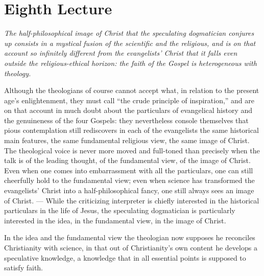 \documentclass[12pt,a4paper]{book}
\begin{document}
\chapter*{Eighth Lecture}
\label{ch:forel8}

\begin{center}\itshape
The half-philosophical image of Christ that the speculating dogmatician
conjures up consists in a mystical fusion of the scientific and the
religious, and is on that account so infinitely different from the
evangelists' Christ that it falls even outside the religious-ethical
horizon: the faith of the Gospel is heterogeneous with theology.
\end{center}

Although the theologians of course cannot accept what, in relation to the present age's
enlightenment, they must call ``the crude principle of inspiration,'' and are on that
account in much doubt about the particulars of evangelical history and the genuineness of
the four Gospels: they nevertheless console themselves that pious contemplation still
rediscovers in each of the evangelists the same historical main features, the same
fundamental religious view, the same image of Christ. The theological voice is never more
moved and full-toned than precisely when the talk is of the leading thought, of the
fundamental view, of the image of Christ. Even when one comes into embarrassment with all
the particulars, one can still cheerfully hold to the fundamental view; even when science
has transformed the evangelists' Christ into a half-philosophical fancy, one still always
sees an image of Christ. --- While the criticizing interpreter is chiefly interested in the
historical particulars in the life of Jesus, the speculating dogmatician is particularly
interested in the idea, in the fundamental view, in the image of Christ.

In the idea and the fundamental view the theologian now supposes he reconciles Christianity
with science, in that out of Christianity's own content he develops a speculative
knowledge, a knowledge that in all essential points is supposed to satisfy faith.
\end{document}
